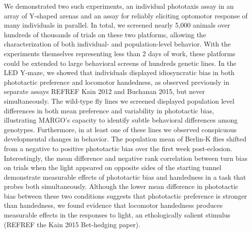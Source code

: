 \documentclass[10pt]{article}
\begin{document}
\begin{multicols}{2}
We demonstrated two such experiments, an individual phototaxis assay in an array of Y-shaped arenas and an assay for reliably eliciting optomotor response of many individuals in parallel. In total, we screened nearly 5,000 animals over hundreds of thousands of trials on these two platforms, allowing the characterization of both individual- and population-level behavior. With the experiments themselves representing less than 2 days of work, these platforms could be extended to large behavioral screens of hundreds genetic lines. In the LED Y-maze, we showed that individuals displayed idiosyncratic bias in both phototactic preference and locomotor handedness, as observed previously in separate assays REFREF Kain 2012 and Buchanan 2015, but never simultaneously. The wild-type fly lines we screened displayed population level differences in both mean preference and variability in phototactic bias, illustrating MARGO's capacity to identify subtle behavioral differences among genotypes. Furthermore, in at least one of these lines we observed conspicuous developmental changes in behavior. The population mean of Berlin-K flies shifted from a negative to positive phototactic bias over the first week post-eclosion. Interestingly, the mean difference and negative rank correlation between turn bias on trials when the light appeared on opposite sides of the starting tunnel demonstrate measurable effects of phototactic bias and handedness in a task that probes both simultaneously. Although the lower mean difference in phototactic bias between these two conditions suggests that phototactic preference is stronger than handedness, we found evidence that locomotor handedness produces measurable effects in the responses to light, an ethologically salient stimulus (REFREF the Kain 2015 Bet-hedging paper). 


\end{multicols}
\end{document}
